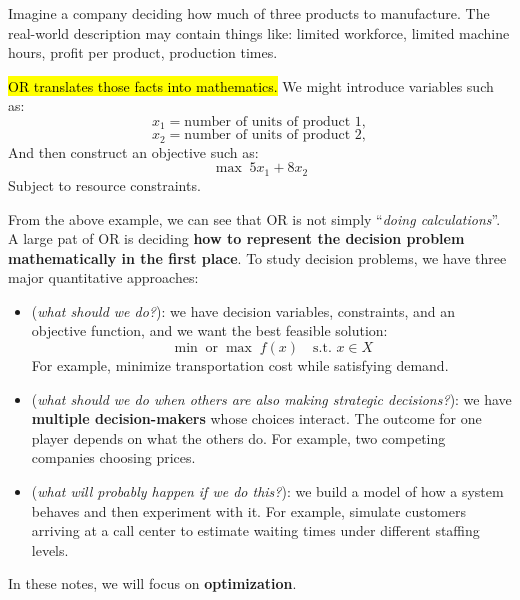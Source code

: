 \begin{examplebox}
    Imagine a company deciding how much of three products to manufacture. The real-world description may contain things like: limited workforce, limited machine hours, profit per product, production times.

    \highspace
    \hl{OR translates those facts into mathematics.} We might introduce variables such as:
    \begin{equation*}
        x_1=\text{number of units of product 1},
    \end{equation*}
    \begin{equation*}
        x_2=\text{number of units of product 2},
    \end{equation*}
    And then construct an objective such as:
    \begin{equation*}
        \max \; 5x_1+8x_2
    \end{equation*}
    Subject to resource constraints.
\end{examplebox}

\highspace
From the above example, we can see that OR is not simply ``\emph{doing calculations}''. A large pat of OR is deciding \textbf{how to represent the decision problem mathematically in the first place}. To study decision problems, we have three major quantitative approaches:
\begin{itemize}
    \item {} (\emph{what should we do?}): we have decision variables, constraints, and an objective function, and we want the best feasible solution:
        \begin{equation*}
            \min \; \text{or} \; \max \; f(x) \quad \text{s.t. } x \in X
        \end{equation*}
        For example, minimize transportation cost while satisfying demand.

    \item {} (\emph{what should we do when others are also making strategic decisions?}): we have \textbf{multiple decision-makers} whose choices interact. The outcome for one player depends on what the others do. For example, two competing companies choosing prices.

    \item {} (\emph{what will probably happen if we do this?}): we build a model of how a system behaves and then experiment with it. For example, simulate customers arriving at a call center to estimate waiting times under different staffing levels.
\end{itemize}
In these notes, we will focus on \textbf{optimization}.

